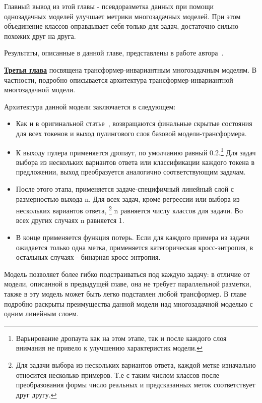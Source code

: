 Главный вывод из этой главы - псевдоразметка данных при помощи однозадачных моделей улучшает метрики многозадачных моделей. При этом объединение классов оправдывает себя только для задач, достаточно сильно похожих друг на друга. 

Результаты, описанные в данной главе, представлены в работе автора~\cite{pseudolabel}.

\underline{\textbf{Третья глава}} посвящена трансформер-инвариантным многозадачным моделям. В частности, подробно описывается архитектура трансформер-инвариантной многозадачной модели.

Архитектура данной модели заключается в следующем:
\begin{itemize}

  \item Как и в оригинальной статье~\cite{bert}, возвращаются финальные скрытые состояния для всех токенов и выход пулингового слоя базовой модели-трансформера. 
  
  \item К выходу пулера применяется дропаут, по умолчанию равный 0.2.\footnote{Варьирование дропаута как на этом этапе, так и после каждого слоя внимания не привело к улучшению характеристик модели.} Для задач выбора из нескольких вариантов ответа или классификации каждого токена в предложении, выход преобразуется аналогично соответствующим задачам.

  \item После этого этапа, применяется задаче-специфичный линейный слой с размерностью выхода {n}. Для всех задач, кроме регрессии или выбора из нескольких вариантов ответа, \footnote{Для задачи выбора из нескольких вариантов ответа, каждой метке изначально относится несколько примеров. Т.е с таким числом классов после преобразования формы число реальных и предсказанных меток соответствует друг другу.} {n} равняется числу классов для задачи. Во всех других случаях {n} равняется 1.
 
  \item В конце применяется функция потерь. Если для каждого примера из задачи ожидается только одна метка, применяется категорическая кросс-энтропия, в остальных случаях - бинарная кросс-энтропия. 

\end{itemize}

Модель позволяет более гибко подстраиваться под каждую задачу: в отличие от модели, описанной в предыдущей главе, она не требует параллельной разметки, также в эту модель может быть легко подставлен любой трансформер. В главе подробно раскрыты преимущества данной модели над многозадачной моделью с одним линейным слоем.

